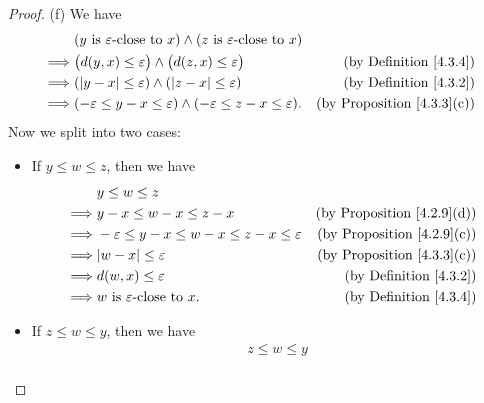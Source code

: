\begin{proof}{(f)}
    We have
    \begin{align*}
                 & (y \text{ is } \varepsilon\text{-close to } x) \land (z \text{ is } \varepsilon\text{-close to } x)                                          \\
        \implies & \big(d(y, x) \leq \varepsilon\big) \land \big(d(z, x) \leq \varepsilon\big)                         & \text{(by Definition \ref{4.3.4})}     \\
        \implies & (\abs*{y - x} \leq \varepsilon) \land (\abs*{z - x} \leq \varepsilon)                               & \text{(by Definition \ref{4.3.2})}     \\
        \implies & (-\varepsilon \leq y - x \leq \varepsilon) \land (-\varepsilon \leq z - x \leq \varepsilon).        & \text{(by Proposition \ref{4.3.3}(c))}
    \end{align*}
    Now we split into two cases:
    \begin{itemize}
        \item If \(y \leq w \leq z\), then we have
              \begin{align*}
                           & y \leq w \leq z                                                                                         \\
                  \implies & y - x \leq w - x \leq z - x                                    & \text{(by Proposition \ref{4.2.9}(d))} \\
                  \implies & -\varepsilon \leq y - x \leq w - x \leq z - x \leq \varepsilon & \text{(by Proposition \ref{4.2.9}(c))} \\
                  \implies & \abs*{w - x} \leq \varepsilon                                  & \text{(by Proposition \ref{4.3.3}(c))} \\
                  \implies & d(w, x) \leq \varepsilon                                       & \text{(by Definition \ref{4.3.2})}     \\
                  \implies & w \text{ is } \varepsilon\text{-close to } x.                  & \text{(by Definition \ref{4.3.4})}
              \end{align*}
        \item If \(z \leq w \leq y\), then we have
              \begin{align*}
                           & z \leq w \leq y                                                                                         \\

\end{align*}
\end{itemize}
\end{proof}
